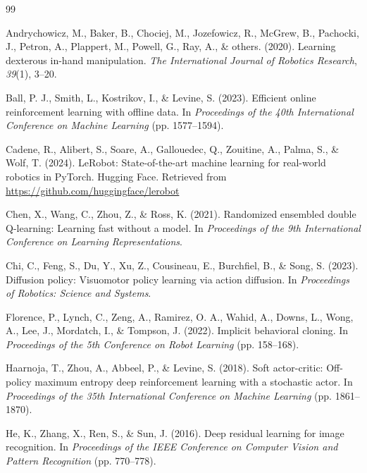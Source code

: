 \documentclass[12pt,a4paper]{article}
\begin{document}
\begin{thebibliography}{99}

Andrychowicz, M., Baker, B., Chociej, M., Jozefowicz, R., McGrew, B., Pachocki, J., Petron, A., Plappert, M., Powell, G., Ray, A., \& others. (2020). Learning dexterous in-hand manipulation. \emph{The International Journal of Robotics Research}, \emph{39}(1), 3--20.

Ball, P. J., Smith, L., Kostrikov, I., \& Levine, S. (2023). Efficient online reinforcement learning with offline data. In \emph{Proceedings of the 40th International Conference on Machine Learning} (pp. 1577--1594).

Cadene, R., Alibert, S., Soare, A., Gallouedec, Q., Zouitine, A., Palma, S., \& Wolf, T. (2024). LeRobot: State-of-the-art machine learning for real-world robotics in PyTorch. Hugging Face. Retrieved from \url{https://github.com/huggingface/lerobot}

Chen, X., Wang, C., Zhou, Z., \& Ross, K. (2021). Randomized ensembled double Q-learning: Learning fast without a model. In \emph{Proceedings of the 9th International Conference on Learning Representations}.

Chi, C., Feng, S., Du, Y., Xu, Z., Cousineau, E., Burchfiel, B., \& Song, S. (2023). Diffusion policy: Visuomotor policy learning via action diffusion. In \emph{Proceedings of Robotics: Science and Systems}.

Florence, P., Lynch, C., Zeng, A., Ramirez, O. A., Wahid, A., Downs, L., Wong, A., Lee, J., Mordatch, I., \& Tompson, J. (2022). Implicit behavioral cloning. In \emph{Proceedings of the 5th Conference on Robot Learning} (pp. 158--168).

Haarnoja, T., Zhou, A., Abbeel, P., \& Levine, S. (2018). Soft actor-critic: Off-policy maximum entropy deep reinforcement learning with a stochastic actor. In \emph{Proceedings of the 35th International Conference on Machine Learning} (pp. 1861--1870).

He, K., Zhang, X., Ren, S., \& Sun, J. (2016). Deep residual learning for image recognition. In \emph{Proceedings of the IEEE Conference on Computer Vision and Pattern Recognition} (pp. 770--778).


\end{thebibliography}
\end{document}
